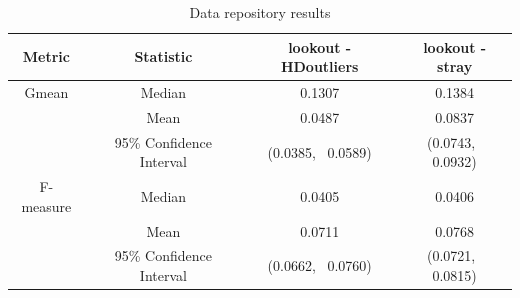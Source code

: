 \documentclass[letter,12pt]{article}
\begin{document}

\begin{table}[!t]
	\centering
	\caption{Data repository results}
	\footnotesize
	\begin{tabular}{cccc}
		\toprule
	Metric & Statistic & lookout - HDoutliers & lookout - stray \\ \midrule
		   Gmean    & Median                    & 0.1307    & 0.1384 \\
		            & Mean                      & 0.0487    & 0.0837 \\
		            & 95\% Confidence Interval & (0.0385, \, 0.0589) &  (0.0743, \, 0.0932) \\
		           \midrule 
        F-measure   & Median                   & 0.0405     & 0.0406  \\  
                    & Mean                     & 0.0711     & 0.0768  \\     
                    & 95\% Confidence Interval & (0.0662, \,  0.0760) &  (0.0721, \,  0.0815)\\
		   \bottomrule
	\end{tabular}
	\label{tab:dataRepository}
\end{table}

\end{document}
